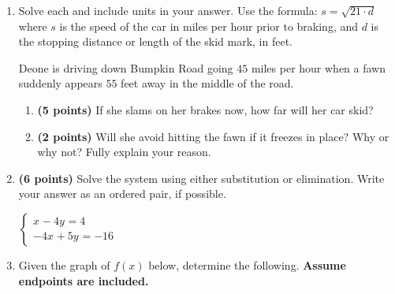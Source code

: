 \documentclass[12pt]{amsart}
\begin{document}
\begin{enumerate}
\vfill 
\def \insvar{21}\def \d{55}\def \zerospeed{33.99}\def \slimit{45}\def \s{57}\def \skidd{154.714}\def \safed{96.429}\def \rsafed{96}

 
\item Solve each and include units in your answer. Use the formula: $s = \sqrt{\insvar \cdot d}$ where $s$ is the speed of the car in miles per hour prior to braking, and $d$ is the stopping distance or length of the skid mark, in feet. 

\vspace{3mm}

Deone is driving down Bumpkin Road going $\slimit$ miles per hour when a fawn suddenly appears $\d$ feet away in the middle of the road. \begin{enumerate}
\item {\bf (5 points)} If she slams on her brakes now, how far will her car skid? \vspace{4cm}
\item {\bf (2 points)} Will she avoid hitting the fawn if it freezes in place? Why or why not? Fully explain your reason. \vspace{3cm}
\end{enumerate}


\newpage\def \xis{4}\def \yis{0}\def \nomatcho{[2,5,3,2]}\def \a{2}\def \c{5}\def \b{3}\def \d{-2}\def \polyonesol{8}\def \polytwosol{20}\def \xgoodone{2x^{}}\def \ygoodone{+3y^{}}\def \xgoodtwo{5x^{}}\def \ygoodtwo{-2y^{}}\def \unitize{[1,0,0,0,1,0]}\def \mtem{2}\def \ntem{-4}\def \ptem{-4}\def \qtem{5}\def \m{1}\def \n{-4}\def \p{-4}\def \q{5}\def \polytonesol{4}\def \polyttwosol{-16}\def \xtgoodone{x^{}}\def \ytgoodone{-4y^{}}\def \xtgoodtwo{-4x^{}}\def \ytgoodtwo{+5y^{}}
\item {\bf (6 points)} 
 Solve the system using either substitution or elimination. Write your answer as an ordered pair, if possible. 

$ \begin{cases} \xtgoodone \ytgoodone = \polytonesol \\
\xtgoodtwo \ytgoodtwo = \polyttwosol
\end{cases}$

 \vfill \vfill
\newpage\def \vshift{3}\def \hshift{2}\def \chang{-1}\def \findval{1}\def \yval{5}

 
\item Given the graph of $f(x)$ below, determine the following. {\bf Assume endpoints are included.}
\vspace{2mm}


\end{enumerate}
\end{document}
